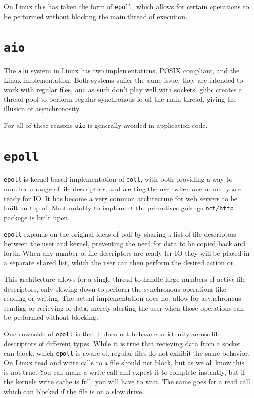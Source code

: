 \documentclass[letterpaper, 10pt, twocolumn]{article}
\begin{document}
On Linux this has taken the form of \texttt{epoll}, which allows for certain operations to be performed without blocking the main thread of execution.
\section{\texttt{aio}}
\label{sec:orgd48162e}
The \texttt{aio} system in Linux has two implementations, POSIX compliant, and the Linux implementation. Both systems suffer the same issue, they are intended to work with regular files, and as such don't play well with sockets. glibc creates a thread pool to perform regular synchronous io off the main thread, giving the illusion of asynchronosity.

For all of these reasons \texttt{aio} is generally avoided in application code.
\section{\texttt{epoll}}
\label{sec:org8b8449a}
\texttt{epoll} is kernel based implementation of \texttt{poll}, with both providing a way to monitor a range of file descriptors, and alerting the user when one or many are ready for IO. It has become a very common architecture for web servers to be built on top of. Most notably to implement the primatives golangs \texttt{net/http} package is built upon.

\texttt{epoll} expands on the original ideas of poll by sharing a list of file descriptors between the user and kernel, preventing the need for data to be copied back and forth. When any number of file descriptors are ready for IO they will be placed in a separate shared list, which the user can then perform the desired action on.

This architecture allows for a single thread to handle large numbers of active file descriptors, only slowing down to perform the synchronous operations like reading or writing. The actual implementation does not allow for asynchronous sending or recieving of data, merely alerting the user when those operations can be performed without blocking.

One downside of \texttt{epoll} is that it does not behave consistently across file descriptors of different types. While it is true that recieving data from a socket can block, which \texttt{epoll} is aware of, regular files do not exhibit the same behavior. On Linux read and write calls to a file should not block, but as we all know this is not true. You can make a write call and expect it to complete instantly, but if the kernels write cache is full, you will have to wait. The same goes for a read call which can blocked if the file is on a slow drive.
\end{document}
